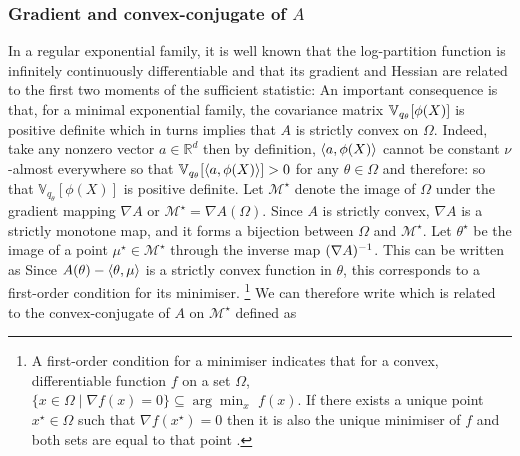 \subsubsection*{Gradient and convex-conjugate of $A$}
In a regular exponential family, it is well known \citep[theorem 2.2]{brown86} that the log-partition function is infinitely continuously differentiable and that its gradient and Hessian are related to the first two moments of the sufficient statistic:
%
%
An important consequence is that, for a minimal exponential family, the covariance matrix $\mathbb V_{q_\theta}[\phi(X)]$ is positive definite which in turns implies that $A$ is strictly convex on $\Omega$. Indeed, take any nonzero vector $a\in\mathbb R^{d}$ then by definition, $\left\langle a,\phi(X) \right\rangle$ cannot be constant $\nu$-almost everywhere so that $\mathbb V_{q_{\theta}}[\left\langle a,\phi(X) \right\rangle] > 0$ for any $\theta\in\Omega$ and therefore:
so that $\mathbb V_{q_{\theta}}[\phi(X)]$ is positive definite. 
Let $\mathcal M^{\star}$ denote the image of $\Omega$ under the gradient mapping $\nabla A$ or $\mathcal M^{\star}=\nabla A(\Omega)$. Since $A$ is strictly convex, $\nabla A$ is a strictly monotone map, and it forms a bijection between $\Omega$ and $\mathcal M^{\star}$. Let $\theta^{\star}$ be the image of a point $\mu^{\star}\in\mathcal M^{\star}$ through the inverse map $(\nabla A)^{-1}$. 
This can be written as
%
%
Since $A(\theta)-\left\langle \theta,\mu \right\rangle$ is a strictly convex function in $\theta$, this corresponds to a first-order condition for its minimiser.
\footnote{A first-order condition for a minimiser indicates that for a convex, differentiable function $f$ on a set $\Omega$, $\{x\in\Omega\mid \nabla f(x)=0 \}\subseteq\arg\min_{x}\,\,f(x)$. If there exists a unique point $x^{\star}\in\Omega$ such that $\nabla f(x^{\star})=0$ then it is also the unique minimiser of $f$ and both sets are equal to that point \citep[theorem 27.1]{rockafellar70}. } We can therefore write
%
%
which is related to the convex-conjugate of $A$ on $\mathcal M^{\star}$ defined as
